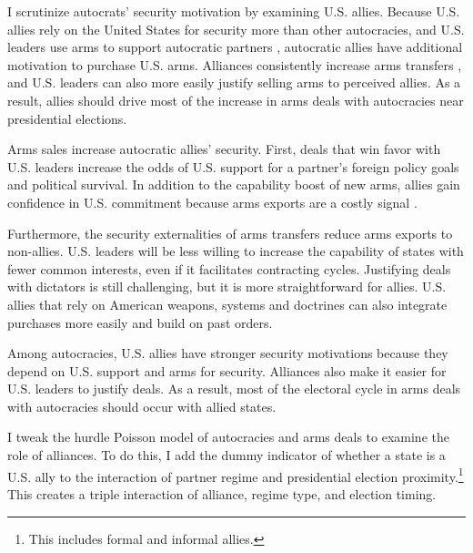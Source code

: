 \documentclass[12pt]{article}
\begin{document}
I scrutinize autocrats' security motivation by examining U.S. allies. 
Because U.S. allies rely on the United States for security more than other autocracies, and U.S. leaders use arms to support autocratic partners \citep{Yarhi-Miloetal2016}, autocratic allies have additional motivation to purchase U.S. arms. 
Alliances consistently increase arms transfers \citep{Thurneretal2019}, and U.S. leaders can also more easily justify selling arms to perceived allies. 
As a result, allies should drive most of the increase in arms deals with autocracies near presidential elections. 




Arms sales increase autocratic allies' security.
First, deals that win favor with U.S. leaders increase the odds of U.S. support for a partner's foreign policy goals and political survival.  
In addition to the capability boost of new arms, allies gain confidence in U.S. commitment because arms exports are a costly signal \citep{McManusYarhi-Milo2017}.


Furthermore, the security externalities of arms transfers reduce arms exports to non-allies. 
U.S. leaders will be less willing to increase the capability of states with fewer common interests, even if it facilitates contracting cycles.
Justifying deals with dictators is still challenging, but it is more straightforward for allies. 
U.S. allies that rely on American weapons, systems and doctrines can also integrate purchases more easily and build on past orders. 


Among autocracies, U.S. allies have stronger security motivations because they depend on U.S. support and arms for security. 
Alliances also make it easier for U.S. leaders to justify deals.
As a result, most of the electoral cycle in arms deals with autocracies should occur with allied states. 


I tweak the hurdle Poisson model of autocracies and arms deals to examine the role of alliances. 
To do this, I add the dummy indicator of whether a state is a U.S. ally to the interaction of partner regime and presidential election proximity.\footnote{This includes formal and informal allies.}
This creates a triple interaction of alliance, regime type, and election timing. 
\end{document}
